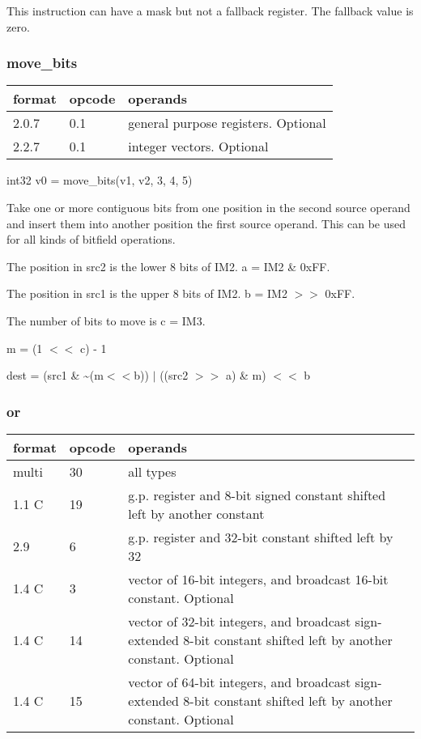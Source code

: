 \documentclass[forwardcom.tex]{subfiles}
\begin{document}
\vspace{2mm}
This instruction can have a mask but not a fallback register. The fallback value is zero.


\subsubsection{move\_bits}
\label{table:moveBitsInstruction}
\begin{tabular}{|p{12mm}|p{12mm}|p{110mm}|}
\hline
\bfseries format & \bfseries opcode & \bfseries operands \\ \hline
2.0.7 & 0.1 & general purpose registers. Optional \\ \hline
2.2.7 & 0.1 & integer vectors. Optional \\ \hline
\end{tabular}
\vspace{2mm}

int32 v0 = move\_bits(v1, v2, 3, 4, 5) 
\vspace{2mm}

Take one or more contiguous bits from one position in the second source operand and insert them into another position the first source operand. This can be used for all kinds of bitfield operations.
\vspace{2mm}

The position in src2 is the lower 8 bits of IM2. a = IM2 \& 0xFF.

The position in src1 is the upper 8 bits of IM2. b = IM2 $>>$ 0xFF.

The number of bits to move is c = IM3.
\vspace{2mm}

m = (1 $<<$ c) - 1

dest = (src1 \& \~{}(m$<<$b)) $|$ ((src2 $>>$ a) \& m) $<<$ b

\subsubsection{or}
\label{table:orInstruction}
\begin{tabular}{|p{12mm}|p{12mm}|p{110mm}|}
\hline
\bfseries format & \bfseries opcode & \bfseries operands \\ \hline
multi & 30 & all types \\ \hline
1.1 C & 19 & g.p. register and 8-bit signed constant shifted left by another constant \\ \hline
2.9   &  6 & g.p. register and 32-bit constant shifted left by 32 \\ \hline
1.4 C &  3 & vector of 16-bit integers, and broadcast 16-bit constant. Optional \\ \hline
1.4 C & 14 & vector of 32-bit integers, and broadcast sign-extended 8-bit constant shifted left by another constant. Optional \\ \hline
1.4 C & 15 & vector of 64-bit integers, and broadcast sign-extended 8-bit constant shifted left by another constant. Optional \\ \hline
\end{tabular}
\vspace{2mm}
\end{document}
